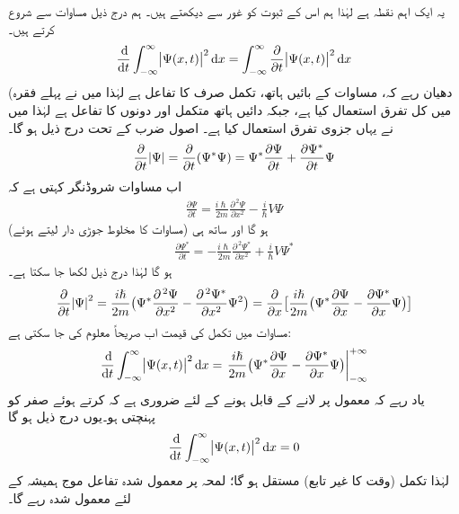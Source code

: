  یہ ایک اہم نقطہ ہے لہٰذا ہم اس کے ثبوت کو غور سے دیکھتے ہیں۔ ہم درج ذیل مساوات سے شروع کرتے ہیں۔
\begin{align}\label{مساوات_تفاعل_موج_الف}
\frac{\dif}{\dif t} \int_{-\infty}^{\infty} \abs{ \Psi (x , t)}^2 \dif x = \int_{- \infty}^{\infty} \frac{ \partial}{\partial t} \abs{ \Psi (x , t)}^2 \dif x 
\end{align}
(دھیان رہے  کہ، مساوات کے بائیں ہاتھ، تکمل صرف   کا تفاعل ہے لہٰذا میں نے پہلے فقرہ میں کل تفرق  استعمال کیا ہے، جبکہ دائیں ہاتھ متکمل  اور  دونوں کا تفاعل ہے لہٰذا میں نے یہاں جزوی تفرق  استعمال کیا ہے۔  اصول ضرب کے تحت درج ذیل ہو گا۔
\begin{align}
\frac{\partial}{\partial t}\abs{\Psi}=\frac{\partial}{\partial t}(\Psi^*\Psi)=\Psi^*\frac{\partial \Psi}{\partial t}+\frac{\partial \Psi^*}{\partial t}\Psi
\end{align}
اب مساوات شروڈنگر کہتی ہے کہ 
\begin{align}\label{مساوات_تفاعل_موج_شروڈنگر_تفرق_الف}
\frac{\partial \Psi}{\partial t}=\frac{i\hslash}{2m}\frac{\partial^{\,2}\Psi}{\partial x^2}-\frac{i}{\hslash}V\Psi
\end{align}
ہو گا اور ساتھ ہی  (مساوات  کا مخلوط جوڑی دار لیتے ہوئے) 
\begin{align}
\frac{\partial \Psi^*}{\partial t}=-\frac{i\hslash}{2m}\frac{\partial^{\,2}\Psi^*}{\partial x^2}+\frac{i}{\hslash}V\Psi^*
\end{align}
ہو گا لہٰذا درج ذیل لکھا جا سکتا ہے۔
\begin{align}\label{مساوات_تفاعل_موج_صریحاً_تکمل_الف}
\frac{\partial}{\partial t}\abs{\Psi}^2=\frac{i\hslash}{2m}\big(\Psi^*\frac{\partial^{\,2} \Psi}{\partial x^2}-\frac{\partial^{\,2}\Psi^*}{\partial x^2}\Psi^2\big)=\frac{\partial}{\partial x}\big[\frac{i\hslash}{2m}\big(\Psi^*\frac{\partial \Psi}{\partial x}-\frac{\partial \Psi^*}{\partial x}\Psi\big)\big]
\end{align}
مساوات  میں تکمل کی قیمت اب  صریحاً معلوم کی جا سکتی ہے:
\begin{align}
\frac{\dif}{\dif t}\int_{-\infty}^{\infty}\abs{\Psi(x,t)}^2\dif x=\left .\frac{i\hslash}{2m}\big(\Psi^*\frac{\partial \Psi}{\partial x}-\frac{\partial \Psi^*}{\partial x}\Psi\big)\right\vert_{-\infty}^{+\infty}
\end{align}
یاد رہے کہ معمول پر لانے کے قابل ہونے کے لئے ضروری ہے کہ  کرتے ہوئے  صفر کو پہنچتی ہو۔یوں درج ذیل ہو گا
\begin{align}\label{مساوات_تفاعل_موج_تکمل_مستقل_ہو_گا}
\frac{\dif}{\dif t}\int_{-\infty}^{\infty}\abs{\Psi(x,t)}^2\dif x=0
\end{align}
لہٰذا تکمل (وقت کا غیر تابع) مستقل ہو گا؛ لمحہ  پر معمول شدہ تفاعل موج ہمیشہ کے لئے معمول شدہ رہے گا۔

